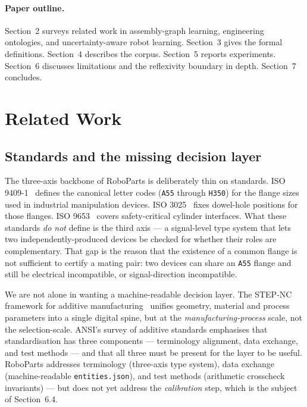 \documentclass[11pt,twocolumn]{article}
\begin{document}
\paragraph{Paper outline.}
Section~2 surveys related work in assembly-graph learning, engineering
ontologies, and uncertainty-aware robot learning. Section~3 gives the
formal definitions. Section~4 describes the corpus. Section~5 reports
experiments. Section~6 discusses limitations and the reflexivity
boundary in depth. Section~7 concludes.

\section{Related Work}

\subsection{Standards and the missing decision layer}

The three-axis backbone of RoboParts is deliberately thin on standards.
\textsc{ISO 9409-1}~\cite{iso9409} defines the canonical letter codes
(\texttt{A55} through \texttt{H350}) for the flange sizes used in
industrial manipulation devices. \textsc{ISO 3025}~\cite{iso3025}
fixes dowel-hole positions for those flanges. \textsc{ISO 9653}~\cite{iso9653}
covers safety-critical cylinder interfaces. What these standards
\emph{do not} define is the third axis — a signal-level type system
that lets two independently-produced devices be checked for whether
their roles are complementary. That gap is the reason that the
existence of a common flange is not sufficient to certify a mating
pair: two devices can share an \texttt{A55} flange and still be
electrical incompatible, or signal-direction incompatible.

We are not alone in wanting a machine-readable decision layer. The
\textsc{STEP-NC} framework for additive manufacturing~\cite{R12}
unifies geometry, material and process parameters into a single
digital spine, but at the \emph{manufacturing-process} scale, not the
selection-scale. \textsc{ANSI}'s survey of additive standards
\cite{R13} emphasises that standardisation has three components —
terminology alignment, data exchange, and test methods — and
that all three must be present for the layer to be useful. RoboParts
addresses terminology (three-axis type system), data exchange
(machine-readable \texttt{entities.json}), and test methods
(arithmetic crosscheck invariants) — but does not yet address the
\emph{calibration} step, which is the subject of Section~6.4.
\end{document}
